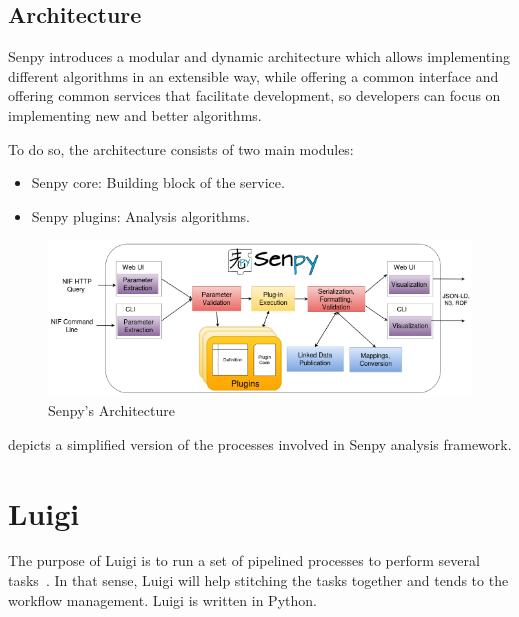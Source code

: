 \subsection{Architecture}
Senpy introduces a modular and dynamic architecture which allows implementing different algorithms in an extensible way, while offering a common interface and offering common services that facilitate development, so developers can focus on implementing new and better algorithms.\par
To do so, the architecture consists of two main modules:
\begin{itemize}
    \item Senpy core: Building block of the service.
    \item Senpy plugins: Analysis algorithms.
\end{itemize}
\begin{figure}
  \includegraphics[width=\linewidth]{img/senpy_architecture.png}
  \caption{Senpy's Architecture~\cite{senpy}}
  \label{fig:senpyarch}
\end{figure}
 depicts a simplified version of the processes involved in Senpy analysis framework.

\section{Luigi}
The purpose of Luigi is to run a set of pipelined processes to perform several tasks~\cite{luigi}. In that sense, Luigi will help stitching the tasks together and tends to the workflow management. Luigi is written in Python.\par
